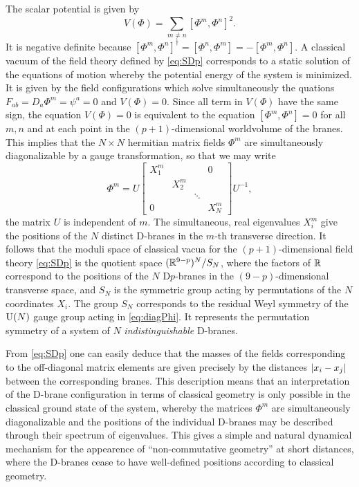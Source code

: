         The scalar potential is given by
        \begin{equation}
            V(\Phi)=\sum_{m\neq n}[\Phi^m,\Phi^n]^2.
        \end{equation}
        It is negative definite because $[\Phi^m,\Phi^n]^\dagger=[\Phi^n,\Phi^m]=-[\Phi^m,\Phi^n]$. A classical vacuum of the ﬁeld theory deﬁned by \eqref{eq:SDp} corresponds to a static solution of the equations of motion whereby the potential energy of the system is minimized. It is given by the field configurations which solve simultaneously the quations $F_{ab}=D_a\Phi^m=\psi^a=0$ and $V(\Phi)=0$. Since all term in $V(\Phi)$ have the same sign, the equation $V(\Phi)=0$ is equivalent to the equation $[\Phi^m,\Phi^n]=0$ for all $m,n$ and at each point in the $(p+1)$-dimensional worldvolume of the branes. This implies that the $N\times N$ hermitian matrix fields $\Phi^m$ are simultaneously diagonalizable by a gauge transformation, so that we may write
        \begin{equation}
            \Phi^m=U
            \begin{bmatrix}
                X^m_1 & & & 0 \\
                & X^m_2 & & \\
                & & \ddots & \\
                0 & & & X^m_N
            \end{bmatrix}U^{-1},\label{eq:diagPhi}
        \end{equation}
        the matrix $U$ is independent of $m$. The simultaneous,
        real eigenvalues $X^m_i$ give the positions of the $N$ distinct D-branes in the $m$-th transverse direction. It follows that the moduli space of classical vacua for the $(p+1)$-dimensional ﬁeld theory \eqref{eq:SDp} is the quotient space $(\mathbb{R}^{9-p})^N/S_N$, where the factors of $\mathbb{R}$ correspond to the positions of the $N$ D$p$-branes in the $(9-p)$-dimensional transverse space, and $S_N$ is the symmetric group acting by permutations of the $N$ coordinates $X_i$. The group $S_N$ corresponds to the residual Weyl symmetry of the $\text{U}(N)$ gauge group acting in \eqref{eq:diagPhi}. It represents the permutation symmetry of a system of $N$ \emph{indistinguishable} D-branes.

        From \eqref{eq:SDp} one can easily deduce that the masses of the ﬁelds corresponding to the oﬀ-diagonal matrix elements are given precisely by the distances $\abs{x_i-x_j}$ between the corresponding branes. This description means that an interpretation of the D-brane conﬁguration in terms of classical geometry is only possible in the classical ground state of the system, whereby the matrices $\Phi^m$ are simultaneously diagonalizable and the positions of the individual D-branes may be described through their spectrum of eigenvalues. This gives a simple and natural dynamical mechanism for the appearence of ``non-commutative geometry'' at short distances, where the D-branes cease to have well-deﬁned positions according to classical geometry.

